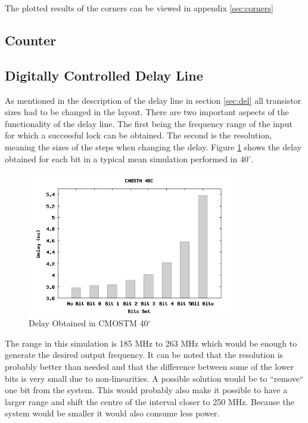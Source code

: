 \documentclass[a4paper,12pt]{article} \usepackage{graphicx}
\newcommand{\degree}{\ensuremath{^\circ}}
\begin{document}
The plotted results of the corners can be viewed in appendix \ref{sec:corners}

\subsection{Counter}

\subsection{Digitally Controlled Delay Line}
As mentioned in the description of the delay line in section \ref{sec:del} all
transistor sizes had to be changed in the layout. There are two important aspects of
the functionality of the delay line. The first being the frequency range of the input
for which a successful lock can be obtained. The second is the resolution,
meaning the sizes of the steps when changing the delay. Figure \ref{fig:del_bit}
shows the delay obtained for each bit in a typical mean simulation performed in
40\degree.

\begin{figure}[h]
    \centering
    \includegraphics[width=0.8\textwidth]{../Bilder/Layout/simulations/delayCMOSTM40.png}
    \caption{Delay Obtained in CMOSTM 40\degree}
    \label{fig:del_bit}
\end{figure}

The range in this simulation is 185 MHz to 263 MHz which would be enough to
generate the desired output frequency. It can be noted that the resolution is
probably better than needed and that the difference between some of the lower
bits is very small due to non-linearities. A possible solution would be to
``remove`` one bit from the system. This would probably also make it possible to
have a larger range and shift the centre of the interval closer to 250 MHz.
Because the system would be smaller it would also consume less power.
\end{document}
